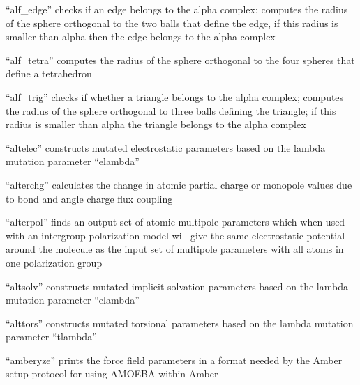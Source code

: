 \documentclass[letterpaper,11pt,english]{sphinxmanual}
\begin{document}
\sphinxAtStartPar
“alf\_edge” checks if an edge belongs to the alpha complex; computes the radius of the sphere orthogonal to the two balls that define the edge, if this radius is smaller than alpha then the edge belongs to the alpha complex

\sphinxAtStartPar
{}

\sphinxAtStartPar
“alf\_tetra” computes the radius of the sphere orthogonal to the four spheres that define a tetrahedron

\sphinxAtStartPar
{}

\sphinxAtStartPar
“alf\_trig” checks if whether a triangle belongs to the alpha complex; computes the radius of the sphere orthogonal to three balls defining the triangle; if this radius is smaller than alpha the triangle belongs to the alpha complex

\sphinxAtStartPar
{}

\sphinxAtStartPar
“altelec” constructs mutated electrostatic parameters based on the lambda mutation parameter “elambda”

\sphinxAtStartPar
{}

\sphinxAtStartPar
“alterchg” calculates the change in atomic partial charge or monopole values due to bond and angle charge flux coupling

\sphinxAtStartPar
{}

\sphinxAtStartPar
“alterpol” finds an output set of atomic multipole parameters which when used with an intergroup polarization model will give the same electrostatic potential around the molecule as the input set of multipole parameters with all atoms in one polarization group

\sphinxAtStartPar
{}

\sphinxAtStartPar
“altsolv” constructs mutated implicit solvation parameters based on the lambda mutation parameter “elambda”

\sphinxAtStartPar
{}

\sphinxAtStartPar
“alttors” constructs mutated torsional parameters based on the lambda mutation parameter “tlambda”

\sphinxAtStartPar
{}

\sphinxAtStartPar
“amberyze” prints the force field parameters in a format needed by the Amber setup protocol for using AMOEBA within Amber
\end{document}
